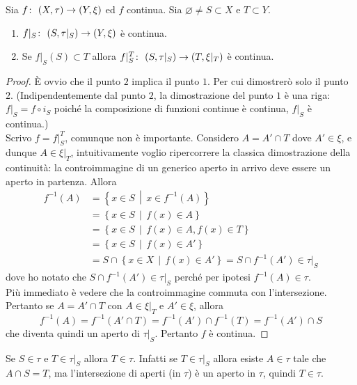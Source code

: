 \begin{theorem}
	Sia $f \colon\ (X,\tau) \rightarrow (Y,\xi)$ ed $f$ continua. Sia $\varnothing \neq S \subset X$ e $T \subset Y$.
	\begin{enumerate}
		\item $f|_S \colon\ (S, \tau|_S) \rightarrow (Y, \xi)$ è continua.
		\item Se $f|_S(S) \subset T$ allora $f|^T_S \colon\ (S, \tau|_S) \rightarrow (T, \xi|_T)$ è continua.
	\end{enumerate}
\end{theorem}
\begin{proof}
	È ovvio che il punto $2$ implica il punto $1$. Per cui dimostrerò solo il punto $2$. (Indipendentemente dal punto $2$, la dimostrazione del punto $1$ è una riga: $f|_S = f \circ i_S$ poiché la composizione di funzioni continue è continua, $f|_S$ è continua.)\\
	
	Scrivo $f = f|^T_S$, comunque non è importante. Considero $A = A' \cap T$ dove $A' \in \xi$, e dunque $A \in \xi|_T$, intuitivamente voglio ripercorrere la classica dimostrazione della continuità: la controimmagine di un generico aperto in arrivo deve essere un aperto in partenza. Allora 
	\begin{align*}
		f^{-1}(A) & = \left\{x \in  S \,\middle|\, x \in f^{-1}(A) \right\}\\
					  & = \left\{x \in  S \,\middle|\, f(x) \in A \right\} \\
					  & = \left\{x \in  S \,\middle|\, f(x) \in A , f(x) \in T \right\} \\
					  & = \left\{x \in  S \,\middle|\, f(x) \in A'\right\} \\
					  & = S \cap \left\{x \in  X \,\middle|\, f(x) \in A'\right\} = S \cap f^{-1}(A') \in \tau|_S
	\end{align*}
	dove ho notato che $S \cap f^{-1}(A') \in \tau|_S$ perché per ipotesi $f^{-1}(A) \in \tau$.\\
	
	Più immediato è vedere che la controimmagine commuta con l'intersezione. Pertanto se $A = A' \cap T$ con $A \in \xi|_T$ e $A' \in \xi$, allora 
	\begin{equation*}
			f^{-1}(A) = f^{-1} (A' \cap T) = f^{-1}(A') \cap f^{-1}(T) = f^{-1}(A') \cap S
	\end{equation*} 
	che diventa quindi un aperto di $\tau|_S$. Pertanto $f$ è continua.
\end{proof}

\begin{remark}
	Se $S \in \tau$ e $T \in \tau|_S$ allora $T \in \tau$. Infatti se $T \in \tau|_S$ allora esiste $A \in \tau$ tale che $A \cap S = T$, ma l'intersezione di aperti (in $\tau$) è un aperto in $\tau$, quindi $T \in \tau$.
\end{remark}

